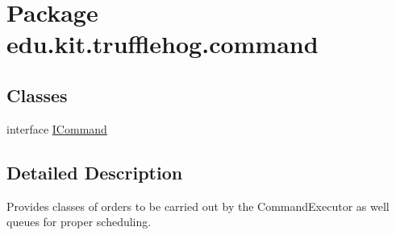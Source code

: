 \hypertarget{namespaceedu_1_1kit_1_1trufflehog_1_1command}{}\section{Package edu.\+kit.\+trufflehog.\+command}
\label{namespaceedu_1_1kit_1_1trufflehog_1_1command}
\subsection*{Classes}
\begin{DoxyCompactItemize}
\item 
interface \hyperlink{interfaceedu_1_1kit_1_1trufflehog_1_1command_1_1_i_command}{I\+Command}
\end{DoxyCompactItemize}


\subsection{Detailed Description}
Provides classes of orders to be carried out by the Command\+Executor as well queues for proper scheduling. 